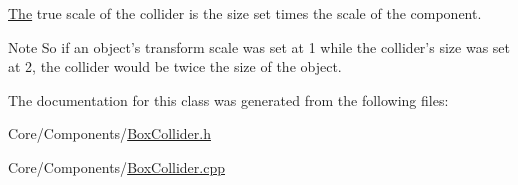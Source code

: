\hyperlink{classThe}{The} true scale of the collider is the size set times the scale of the component. 

\begin{DoxyNote}{Note}
So if an object's transform scale was set at 1 while the collider's size was set at 2, the collider would be twice the size of the object. 
\end{DoxyNote}


The documentation for this class was generated from the following files\-:\begin{DoxyCompactItemize}
\item 
Core/\-Components/\hyperlink{BoxCollider_8h}{Box\-Collider.\-h}\item 
Core/\-Components/\hyperlink{BoxCollider_8cpp}{Box\-Collider.\-cpp}\end{DoxyCompactItemize}
